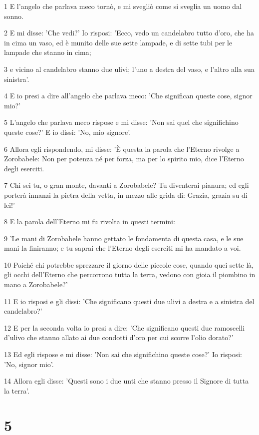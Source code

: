 \par 1 E l'angelo che parlava meco tornò, e mi svegliò come si sveglia un uomo dal sonno.
\par 2 E mi disse: 'Che vedi?' Io risposi: 'Ecco, vedo un candelabro tutto d'oro, che ha in cima un vaso, ed è munito delle sue sette lampade, e di sette tubi per le lampade che stanno in cima;
\par 3 e vicino al candelabro stanno due ulivi; l'uno a destra del vaso, e l'altro alla sua sinistra'.
\par 4 E io presi a dire all'angelo che parlava meco: 'Che significan queste cose, signor mio?'
\par 5 L'angelo che parlava meco rispose e mi disse: 'Non sai quel che significhino queste cose?' E io dissi: 'No, mio signore'.
\par 6 Allora egli rispondendo, mi disse: 'È questa la parola che l'Eterno rivolge a Zorobabele: Non per potenza né per forza, ma per lo spirito mio, dice l'Eterno degli eserciti.
\par 7 Chi sei tu, o gran monte, davanti a Zorobabele? Tu diventerai pianura; ed egli porterà innanzi la pietra della vetta, in mezzo alle grida di: Grazia, grazia su di lei!'
\par 8 E la parola dell'Eterno mi fu rivolta in questi termini:
\par 9 'Le mani di Zorobabele hanno gettato le fondamenta di questa casa, e le sue mani la finiranno; e tu saprai che l'Eterno degli eserciti mi ha mandato a voi.
\par 10 Poiché chi potrebbe sprezzare il giorno delle piccole cose, quando quei sette là, gli occhi dell'Eterno che percorrono tutta la terra, vedono con gioia il piombino in mano a Zorobabele?'
\par 11 E io risposi e gli dissi: 'Che significano questi due ulivi a destra e a sinistra del candelabro?'
\par 12 E per la seconda volta io presi a dire: 'Che significano questi due ramoscelli d'ulivo che stanno allato ai due condotti d'oro per cui scorre l'olio dorato?'
\par 13 Ed egli rispose e mi disse: 'Non sai che significhino queste cose?' Io risposi: 'No, signor mio'.
\par 14 Allora egli disse: 'Questi sono i due unti che stanno presso il Signore di tutta la terra'.

\chapter{5}

